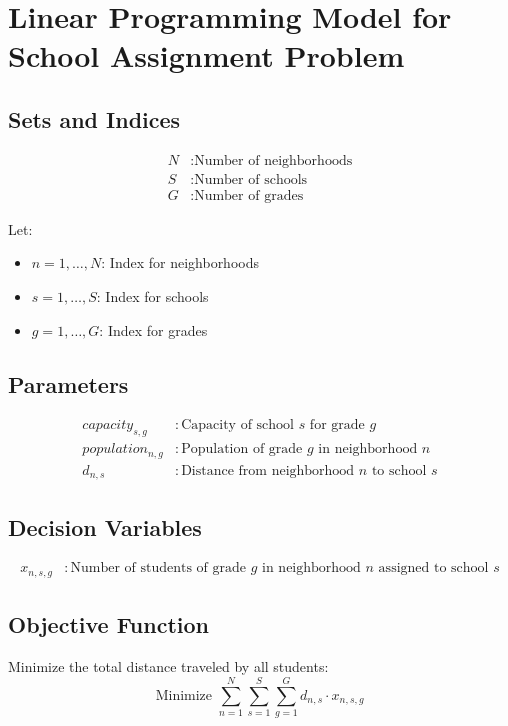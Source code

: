 \documentclass{article}
\begin{document}
\section*{Linear Programming Model for School Assignment Problem}

\subsection*{Sets and Indices}
\begin{align*}
N & : \text{Number of neighborhoods} \\
S & : \text{Number of schools} \\
G & : \text{Number of grades}
\end{align*}

Let:
\begin{itemize}
    \item $n = 1, \ldots, N$: Index for neighborhoods
    \item $s = 1, \ldots, S$: Index for schools
    \item $g = 1, \ldots, G$: Index for grades
\end{itemize}

\subsection*{Parameters}
\begin{align*}
capacity_{s,g} & : \text{Capacity of school } s \text{ for grade } g \\
population_{n,g} & : \text{Population of grade } g \text{ in neighborhood } n \\
d_{n,s} & : \text{Distance from neighborhood } n \text{ to school } s
\end{align*}

\subsection*{Decision Variables}
\begin{align*}
x_{n,s,g} & : \text{Number of students of grade } g \text{ in neighborhood } n \text{ assigned to school } s
\end{align*}

\subsection*{Objective Function}
Minimize the total distance traveled by all students:
\[
\text{Minimize } \sum_{n=1}^{N} \sum_{s=1}^{S} \sum_{g=1}^{G} d_{n,s} \cdot x_{n,s,g}
\]
\end{document}
